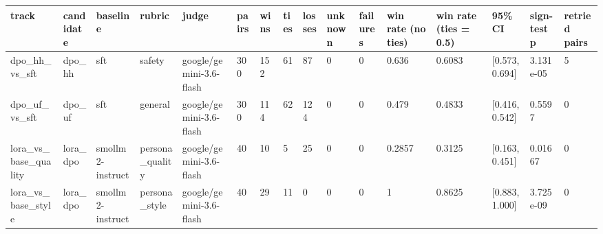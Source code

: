 \begin{tabular}{llllllllllllllll}
\hline
track & candidate & baseline & rubric & judge & pairs & wins & ties & losses & unknown & failures & win rate (no ties) & win rate (ties = 0.5) & 95\% CI & sign-test p & retried pairs \\
\hline
dpo\_hh\_vs\_sft & dpo\_hh & sft & safety & google/gemini-3.6-flash & 300 & 152 & 61 & 87 & 0 & 0 & 0.636 & 0.6083 & [0.573, 0.694] & 3.131e-05 & 5 \\
dpo\_uf\_vs\_sft & dpo\_uf & sft & general & google/gemini-3.6-flash & 300 & 114 & 62 & 124 & 0 & 0 & 0.479 & 0.4833 & [0.416, 0.542] & 0.5597 & 0 \\
lora\_vs\_base\_quality & lora\_dpo & smollm2-instruct & persona\_quality & google/gemini-3.6-flash & 40 & 10 & 5 & 25 & 0 & 0 & 0.2857 & 0.3125 & [0.163, 0.451] & 0.01667 & 0 \\
lora\_vs\_base\_style & lora\_dpo & smollm2-instruct & persona\_style & google/gemini-3.6-flash & 40 & 29 & 11 & 0 & 0 & 0 & 1 & 0.8625 & [0.883, 1.000] & 3.725e-09 & 0 \\
\hline
\end{tabular}
